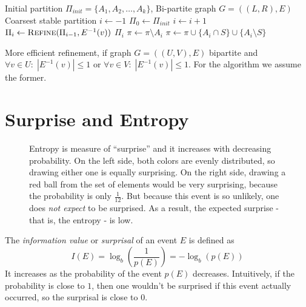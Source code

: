 		\begin{algorithm}[ht!]
			\centering
			\begin{algorithmic}
				\Require Initial partition $\Pi_{init} = \{ A_1, A_2, \ldots, A_k \}$, Bi-partite graph $G = ((L, R), E)$
				\Ensure Coarsest stable partition
				\Statex
					\State $i \gets -1$
					\State $\Pi_0 \gets \Pi_{init}$
						\State $i \gets i + 1$
						\State $\Pi_{i} \gets \Call{Refine}{\Pi_{i-1}, E^{-1}(v)}$
					\EndFor
					\State \Return $\Pi_i$
				\EndFunction
				\Statex
						\State $\pi \gets \pi \setminus A_i$
						\State $\pi \gets \pi \cup \{ A_i \cap S \} \cup \{ A_i \setminus S \}$ 
					\EndFor
				\EndFunction
			\end{algorithmic}
			\caption{More efficient refinement, if graph $G=((U, V), E)$ bipartite and $\forall v \in U:\; |E^{-1}(v)| \leq 1$ or $\forall v \in V:\; |E^{-1}(v)| \leq 1$. For the algorithm we assume the former.}
			\label{algo:prelims:refinement:bipartite}
		\end{algorithm}
		
		
	
		\clearpage
	
	\section{Surprise and Entropy}
	
		\begin{figure}[ht!]
			\centering
			
			\caption{Entropy is measure of \enquote{surprise} and it increases with decreasing probability. On the left side, both colors are evenly distributed, so drawing either one is equally surprising. On the right side, drawing a red ball from the set of elements would be very surprising, because the probability is only $\frac{1}{12}$. But because this event is so unlikely, one does \textit{not expect} to be surprised. As a result, the expected surprise - that is, the entropy - is low.}
			\label{figure:prelim:entropy}
		\end{figure}
	
		The \textit{information value} or \textit{surprisal} of an event $E$ is defined as
		\begin{equation}
			I(E) = \log_b \left( \frac{1}{p(E)} \right) = - \log_b \left( p(E) \right)
		\end{equation}
		It increases as the probability of the event $p(E)$ decreases.
		Intuitively, if the probability is close to $1$, then one wouldn't be surprised if this event actually occurred, so the surprisal is close to $0$.
		
